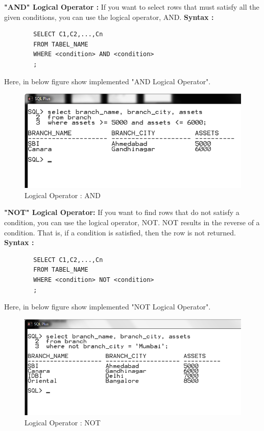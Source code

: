 \documentclass[12pt,a4paper]{report}
\begin{document}
\begin{enumerate}
{		\textbf{"AND" Logical Operator : }
		If you want to select rows that must satisfy all the given conditions, you can use the logical operator, AND. 
		}
		\textbf{Syntax :}		
		\begin{verbatim}
		SELECT C1,C2,...,Cn
		FROM TABEL_NAME
		WHERE <condition> AND <condition>
		;
		\end{verbatim}
		Here, in below figure show implemented "AND Logical Operator".
		\begin{figure}[H]
			\centering
			\includegraphics[scale=.55]{./images/prac1_and2}
			\caption{Logical Operator : AND}
		\end{figure}		
		
		\textbf{"NOT" Logical Operator:}
		If you want to find rows that do not satisfy a condition, you can use the logical operator, NOT. NOT results in the reverse of a condition. That is, if a condition is satisfied, then the row is not returned. 
		\textbf{Syntax :}		
		\begin{verbatim}
		SELECT C1,C2,...,Cn
		FROM TABEL_NAME
		WHERE <condition> NOT <condition>
		;
		\end{verbatim}		
		Here, in below figure show implemented "NOT Logical Operator".
		\begin{figure}[H]
			\centering
			\includegraphics[scale=.55]{./images/prac1_not2}
			\caption{Logical Operator : NOT}
		\end{figure}		
		

\end{enumerate}
\end{document}
